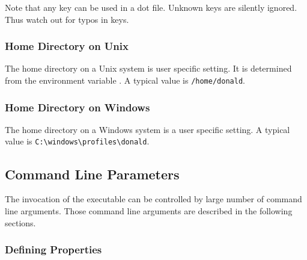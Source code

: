 Note that any key can be used in a dot file. Unknown
keys are silently ignored. Thus watch out for typos in keys.


\subsubsection{Home Directory on Unix}%

The home directory on a Unix system is user specific
setting. It is determined from the environment variable . A
typical value is \texttt{/home/donald}.

\subsubsection{Home Directory on Windows}%

The home directory on a Windows system is a user
specific setting.  A typical value is
\verb|C:\windows\profiles\donald|.
%
%

\subsection{Command Line Parameters}

The invocation of the executable  can be controlled by
large number of command line arguments. Those command line arguments
are described in the following sections.

\subsubsection{Defining Properties}

